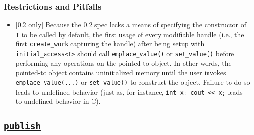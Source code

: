 \begin{subs}
\subsubsection{Restrictions and Pitfalls} 
\begin{itemize}
  \item {\color{red}[0.2 only]} Because the 0.2 spec lacks a means of specifying
  the constructor of \texttt{T} to be called by default, the first usage of
  every modifiable handle (i.e., the first {\texttt{create\_work}} capturing the
  handle) after being setup with \texttt{initial\_access<T>} should call
  \texttt{emplace\_value()} or \texttt{set\_value()} before performing any
  operations on the pointed-to object.  In other words, the pointed-to object
  contains uninitialized memory until the user invokes 
  \texttt{emplace\_value(...)} or \texttt{set\_value()} to construct the object.
  Failure to do so leads to undefined behavior (just as, for instance,
  \texttt{int x; cout << x;} leads to undefined behavior in C). 
\end{itemize}

\end{subs}



\clearpage
\subsection{\underline{\texttt{publish}}}
\label{ssec:api_fe_publish}

